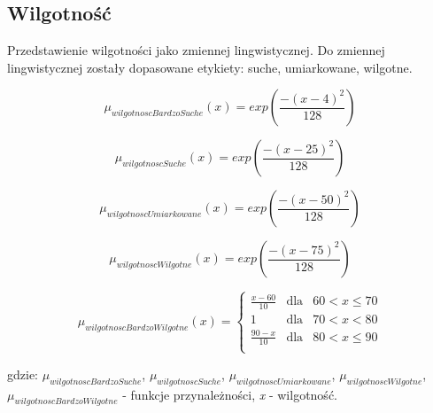 \documentclass{classrep}
\begin{document}
\subsection{Wilgotność}
Przedstawienie wilgotności jako zmiennej lingwistycznej. Do zmiennej lingwistycznej zostały dopasowane etykiety: suche, umiarkowane, wilgotne.

\begin{equation}
\mu _{wilgotnoscBardzoSuche}(x) = exp( \frac{- (x - 4)^2}{128} )
\end{equation}

\begin{equation}
\mu _{wilgotnoscSuche}(x) = exp( \frac{- (x - 25)^2}{128} )
\end{equation}

\begin{equation}
\mu _{wilgotnoscUmiarkowane}(x) = exp( \frac{- (x - 50)^2}{128} )
\end{equation}

\begin{equation}
\mu _{wilgotnoscWilgotne}(x) = exp( \frac{- (x - 75)^2}{128} )
\end{equation}

\begin{equation}
\mu _{wilgotnoscBardzoWilgotne}(x) = \left\{ \begin{array}{rcl}
\frac{x - 60}{10} & \mbox{dla} & 60 < x \leq 70\\
1 & \mbox{dla} & 70 < x < 80\\
\frac{90 - x}{10} & \mbox{dla} & 80 < x \leq 90\\
\end{array}\right.
\end{equation}

gdzie: \(\mu _{wilgotnoscBardzoSuche}\), \(\mu _{wilgotnoscSuche}\), \(\mu _{wilgotnoscUmiarkowane}\), \(\mu _{wilgotnoscWilgotne}\), \(\mu _{wilgotnoscBardzoWilgotne}\) - funkcje przynależności, \textit{x} - wilgotność.
\end{document}
